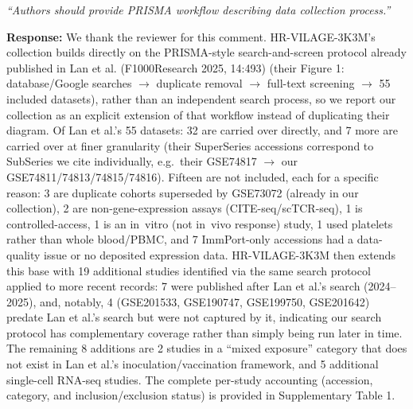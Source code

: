 \documentclass[11pt]{article}
\newcommand{\origcomment}[1]{\textit{``#1''}}
\newcommand{\filledresponse}[1]{%
  \par\medskip\noindent\textbf{Response:} #1\par
  \vspace{0.4cm}%
  \par\noindent\hrulefill\par\bigskip
}
\begin{document}
\begin{commentlist}

\item[R1-1.] \origcomment{Authors should provide PRISMA workflow describing data collection
process.}
\filledresponse{We thank the reviewer for this comment. HR-VILAGE-3K3M's collection builds directly on the PRISMA-style search-and-screen
protocol already published in Lan et al. (F1000Research 2025, 14:493) (their Figure 1: database/Google
searches $\rightarrow$ duplicate removal $\rightarrow$ full-text screening $\rightarrow$ 55 included
datasets), rather than an independent search process, so we report our collection as an explicit
extension of that workflow instead of duplicating their diagram. Of Lan et al.'s 55 datasets: 32 are
carried over directly, and 7 more are carried over at finer granularity (their SuperSeries
accessions correspond to SubSeries we cite individually, e.g.\ their GSE74817 $\rightarrow$ our
GSE74811/74813/74815/74816). Fifteen are not included, each for a specific reason: 3 are duplicate
cohorts superseded by GSE73072 (already in our collection), 2 are non-gene-expression assays
(CITE-seq/scTCR-seq), 1 is controlled-access, 1 is an in~vitro (not in~vivo response) study, 1 used
platelets rather than whole blood/PBMC, and 7 ImmPort-only accessions had a data-quality issue or no
deposited expression data. HR-VILAGE-3K3M then extends this base with 19 additional studies
identified via the same search protocol applied to more recent records: 7 were published after Lan
et al.'s search (2024--2025), and, notably, 4 (GSE201533, GSE190747, GSE199750, GSE201642) predate
Lan et al.'s search but were not captured by it, indicating our search protocol has complementary
coverage rather than simply being run later in time. The remaining 8 additions are 2 studies in a
``mixed exposure'' category that does not exist in Lan et al.'s inoculation/vaccination framework,
and 5 additional single-cell RNA-seq studies. The complete per-study accounting (accession, category,
and inclusion/exclusion status) is provided in Supplementary Table 1.}


\end{commentlist}
\end{document}

